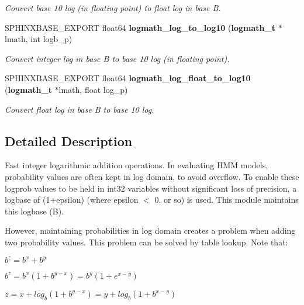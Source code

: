 \begin{DoxyCompactItemize}
\begin{DoxyCompactList}\small\item\em Convert base 10 log (in floating point) to float log in base B. \end{DoxyCompactList}\item 
S\-P\-H\-I\-N\-X\-B\-A\-S\-E\-\_\-\-E\-X\-P\-O\-R\-T float64 {\bf logmath\-\_\-log\-\_\-to\-\_\-log10} ({\bf logmath\-\_\-t} $\ast$lmath, int logb\-\_\-p)\label{logmath_8h_a7c17cb624003975e84fbd141ca6e2e06}

\begin{DoxyCompactList}\small\item\em Convert integer log in base B to base 10 log (in floating point). \end{DoxyCompactList}\item 
S\-P\-H\-I\-N\-X\-B\-A\-S\-E\-\_\-\-E\-X\-P\-O\-R\-T float64 {\bf logmath\-\_\-log\-\_\-float\-\_\-to\-\_\-log10} ({\bf logmath\-\_\-t} $\ast$lmath, float log\-\_\-p)\label{logmath_8h_a32491ca5b2688fb633d85ab866dcf858}

\begin{DoxyCompactList}\small\item\em Convert float log in base B to base 10 log. \end{DoxyCompactList}\end{DoxyCompactItemize}


\subsection{Detailed Description}
Fast integer logarithmic addition operations. In evaluating H\-M\-M models, probability values are often kept in log domain, to avoid overflow. To enable these logprob values to be held in int32 variables without significant loss of precision, a logbase of (1+epsilon) (where epsilon $<$ 0. or so) is used. This module maintains this logbase (B).

However, maintaining probabilities in log domain creates a problem when adding two probability values. This problem can be solved by table lookup. Note that\-:


\begin{DoxyItemize}
\item $ b^z = b^x + b^y $
\item $ b^z = b^x(1 + b^{y-x}) = b^y(1 + e^{x-y}) $
\item $ z = x + log_b(1 + b^{y-x}) = y + log_b(1 + b^{x-y}) $
\end{DoxyItemize}

